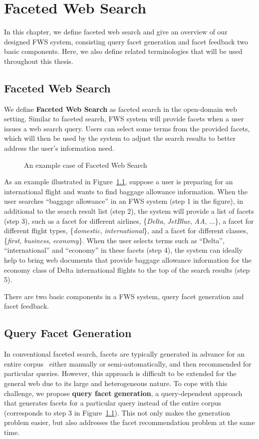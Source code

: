 \chapter{Faceted Web Search}
In this chapter, we define faceted web search and give an overview of our designed FWS system, consisting query facet generation and facet feedback two basic components. Here, we also define related terminologies that will be used throughout this thesis.

\section{Faceted Web Search}
\label{sec:fws}
We define \textbf{Faceted Web Search} as faceted search in the open-domain web setting. Similar to faceted search, FWS system will provide facets when a user issues a web search query. Users can select some terms from the provided facets, which will then be used by the system to adjust the search results to better address the user's information need.
\begin{figure}[ht!]
\centering
{}
\caption{An example case of Faceted Web Search}
\label{fig:fws-example}
\end{figure}
As an example illustrated in Figure~\ref{fig:fws-example}, suppose a user is preparing for an international flight and wants to find baggage allowance information. When the user searches ``baggage allowance'' in an FWS system (step 1 in the figure), in additional to the search result list (step 2), the system will provide a list of facets (step 3), such as a facet for different airlines, \{\textit{Delta}, \textit{JetBlue}, \textit{AA}, ...\}, a facet for different flight types, \{\textit{domestic}, \textit{international}\}, and a facet for different classes, \{\textit{first}, \textit{business}, \textit{economy}\}. When the user selects terms such as ``Delta'', ``international'' and ``economy'' in these facets (step 4), the system can ideally help to bring web documents that provide baggage allowance information for the economy class of Delta international flights to the top of the search results (step 5).

There are two basic components in a FWS system, query facet generation and facet feedback.

\section{Query Facet Generation}
In conventional faceted search, facets are typically generated in advance for an entire corpus~\cite{stoica2007automating,dakka2008automatic} either manually or semi-automatically, and then recommended for particular queries. However, this approach is difficult to be extended for the general web due to its large and heterogeneous nature. To cope with this challenge, we propose \textbf{query facet generation}, a query-dependent approach that generates facets for a particular query instead of the entire corpus (corresponds to step 3 in Figure~\ref{fig:fws-example}). This not only makes the generation problem easier, but also addresses the facet recommendation problem at the same time.

